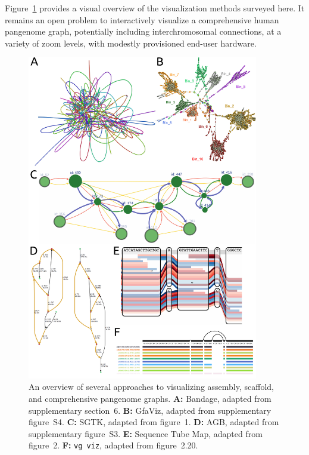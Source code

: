 Figure~\ref{fig:visualization} provides a visual overview of the visualization methods surveyed here. It remains an open problem to interactively visualize a comprehensive human pangenome graph, potentially including interchromosomal connections, at a variety of zoom levels, with modestly provisioned end-user hardware.

\begin{figure}[h]
    \includegraphics[width=0.9\textwidth]{figures/visualization.pdf}
    \caption{\label{fig:visualization} An overview of several approaches to visualizing assembly, scaffold, and comprehensive pangenome graphs. \textbf{A:} Bandage, adapted from \cite{Wick_2015} supplementary section~6. \textbf{B:} GfaViz, adapted from \cite{Gonnella_2018} supplementary figure~S4. \textbf{C:} SGTK, adapted from \cite{Kunyavskaya_2018} figure~1. \textbf{D:} AGB, adapted from \cite{Mikheenko_2019} supplementary figure~S3. \textbf{E:} Sequence Tube Map, adapted from \cite{Beyer_2019} figure~2. \textbf{F:} \texttt{vg viz}, adapted from \cite{Garrison_2019} figure~2.20.}
\end{figure}


